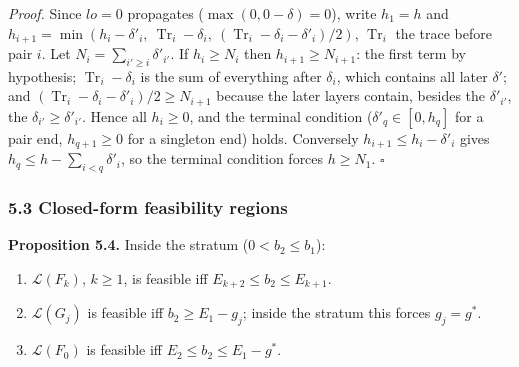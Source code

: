 \documentclass[
  11pt,
  a4paper,
]{article}
\providecommand{\tightlist}{%
  \setlength{\itemsep}{0pt}\setlength{\parskip}{0pt}}
\begin{document}
\emph{Proof.} Since \(lo=0\) propagates (\(\max(0,\allowbreak{}0-\delta)=0\)), write
\(h_1=h\) and
\(h_{i+1}=\min(h_i-\delta'_i,\allowbreak{}\ \operatorname{Tr}_i-\delta_i,\allowbreak{}\ (\operatorname{Tr}_i-\delta_i-\delta'_i)/2)\),
\(\operatorname{Tr}_i\) the trace before pair \(i\). Let
\(N_i=\sum_{i'\ge i}\delta'_{i'}\). If \(h_i\ge N_i\) then
\(h_{i+1}\ge N_{i+1}\): the first term by hypothesis;
\(\operatorname{Tr}_i-\delta_i\) is the sum of everything after
\(\delta_i\), which contains all later \(\delta'\); and
\((\operatorname{Tr}_i-\delta_i-\delta'_i)/2\ge N_{i+1}\) because the
later layers contain, besides the \(\delta'_{i'}\), the
\(\delta_{i'}\ge\delta'_{i'}\). Hence all \(h_i\ge0\), and the terminal
condition (\(\delta'_q\in[0,\allowbreak{}h_q]\) for a pair end, \(h_{q+1}\ge0\) for a
singleton end) holds. Conversely \(h_{i+1}\le h_i-\delta'_i\) gives
\(h_q\le h-\sum_{i<q}\delta'_i\), so the terminal condition forces
\(h\ge N_1\). \(\square\)

\subsubsection{5.3 Closed-form feasibility
regions}\label{closed-form-feasibility-regions}

\textbf{Proposition 5.4.} Inside the stratum (\(0<b_2\le b_1\)):

\begin{enumerate}
\def\labelenumi{\arabic{enumi}.}
\tightlist
\item
  \(\mathcal L(F_k)\), \(k\ge1\), is feasible iff
  \(E_{k+2}\le b_2\le E_{k+1}\).
\item
  \(\mathcal L(G_j)\) is feasible iff \(b_2\ge E_1-g_j\); inside the
  stratum this forces \(g_j=g^*\).
\item
  \(\mathcal L(F_0)\) is feasible iff \(E_2\le b_2\le E_1-g^*\).
\end{enumerate}
\end{document}
